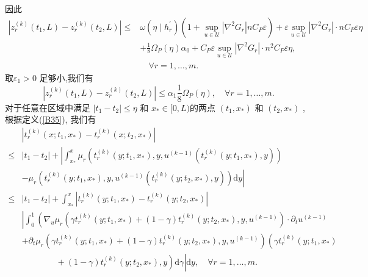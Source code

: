 \documentclass[notitlepage,cs4size,punct,oneside]{ctexrep}
\numberwithin{equation}{chapter}
\theoremstyle{mystyle}
\begin{document}
因此
\begin{align}
    \left|z_{r}^{(k)}\left(t_{1}, L\right)-z_{r}^{(k)}\left(t_{2}, L\right)\right| \leq & \omega\left(\eta \mid h_{r}^{\prime}\right)\left(1+\sup _{u \in \mathcal{U}}\left|\nabla^{2} G_{r}\right| n C_{P} \varepsilon\right)+\varepsilon \sup _{u \in \mathcal{U}}\left|\nabla^{2} G_{r}\right| \cdot n C_{P} \varepsilon \eta \nonumber \\
                                                                                        & +\frac{1}{8} \Omega_{P}(\eta) \alpha_{0}+C_{P} \varepsilon \sup _{u \in \mathcal{U}}\left|\nabla^{2} G_{r}\right| \cdot n^{2} C_{P} \varepsilon \eta,\nonumber                                                                                   \\&
    \quad \forall r=1, \ldots, m .\label{B63}
\end{align}
取$\varepsilon_{1}>0$ 足够小,我们有
\begin{equation} \label{B64}
    \left|z_{r}^{(k)}\left(t_{1}, L\right)-z_{r}^{(k)}\left(t_{2}, L\right)\right| \leq \alpha_{1} \frac{1}{8} \Omega_{P}(\eta), \quad \forall r=1, \ldots, m.
\end{equation}
对于任意在区域中满足 $\left|t_{1}-t_{2}\right| \leq \eta$ 和 $x_{*} \in[0, L)$的两点 $\left(t_{1}, x_{*}\right)$ 和 $\left(t_{2}, x_{*}\right)$ ,根据定义(\ref{B35}), 我们有
\begin{align}
         & \left|t_{r}^{(k)}\left(x ; t_{1}, x_{*}\right)-t_{r}^{(k)}\left(x ; t_{2}, x_{*}\right)\right|\nonumber                                                                                                                        \\
    \leq & \left|t_{1}-t_{2}\right|+\left|\int_{x_{*}}^{x} \mu_{r}\left(t_{r}^{(k)}\left(y ; t_{1}, x_{*}\right), y,u^{(k-1)}\left(t_{r}^{(k)}\left(y ; t_{1}, x_{*}\right), y\right)\right) \right.\nonumber                             \\
         & \left. -\mu_{r}\left(t_{r}^{(k)}\left(y ; t_{1}, x_{*}\right), y,u^{(k-1)}\left(t_{r}^{(k)}\left(y ; t_{2}, x_{*}\right), y\right)\right) \mathrm{d} y\right| \nonumber                                                        \\
    \leq & \left|t_{1}-t_{2}\right|+\int_{x_{*}}^{x} \left|t_{r}^{(k)}\left(y ; t_{1}, x_{*}\right)-t_{r}^{(k)}\left(y ; t_{2}, x_{*}\right) \right|\nonumber                                                                             \\
         & \left| \int_{0}^{1}\left(\nabla_{u} \mu_{r}\left(\gamma t_{r}^{(k)}\left(y ; t_{1}, x_{*}\right)+(1-\gamma) t_{r}^{(k)}\left(y ; t_{2}, x_{*}\right), y,u^{(k-1)}\right) \cdot \partial_{t} u^{(k-1)}  \right.\right.\nonumber \\
         & +  \partial_{t} \mu_{r}\left(\gamma t_{r}^{(k)}\left(y ; t_{1}, x_{*}\right)+(1-\gamma) t_{r}^{(k)}\left(y ; t_{2}, x_{*}\right),y,u^{(k-1)}\right)\left(\gamma t_{r}^{(k)}\left(y ; t_{1}, x_{*}\right) \right.\nonumber      \\
         & \quad\quad\quad\quad +\left.\left. (1-\gamma) t_{r}^{(k)}\left(y ; t_{2}, x_{*}\right), y\right) \mathrm{d} \gamma \right|\mathrm{d} y , \quad \forall r=1, \ldots, m .\label{B65}
\end{align}
\end{document}
